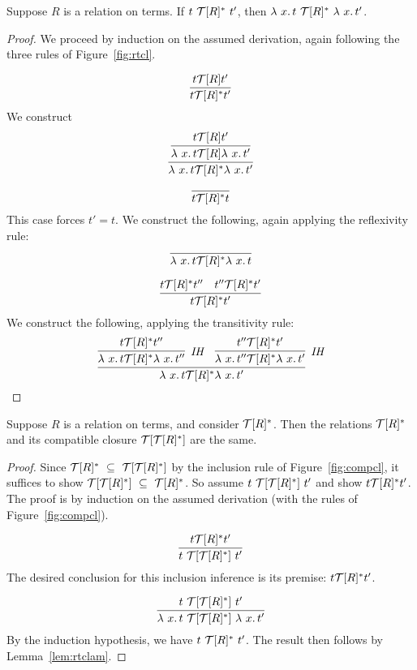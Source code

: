 \begin{lemma}
\label{lem:rtclam}
Suppose $R$ is a relation on terms.  
If $t\ \Tau[R]^*\ t'$, then $\lam{x}{t}\ \Tau[R]^*\ \lam{x}{t'}$.
\end{lemma}
\begin{proof}
We proceed by induction on the assumed derivation, again following the three rules of Figure~\ref{fig:rtcl}.

  \case{ }
  \[
  \infer{t \Tau[R]^* t'}{t \Tau[R] t'}
  \]
  \noindent We construct
  \[
  \infer{\lam{x}{t} \Tau[R]^* \lam{x}{t'}}
        {\infer{\lam{x}{t} \Tau[R] \lam{x}{t'}}
               {t \Tau[R] t'}}
  \]

  \case{ }
  \[
  \infer{t \Tau[R]^* t}{\ }
  \]
  \noindent This case forces $t' = t$.  We construct the following, again applying the reflexivity rule:
  \[
  \infer{\lam{x}{t} \Tau[R]^* \lam{x}{t}}{\ }
  \]

  \case{ }
  \[
  \infer{t \Tau[R]^* t'}{t \Tau[R]^* t'' & t'' \Tau[R]^* t'}
  \]
  \noindent We construct the following, applying the transitivity rule:
  \[
  \infer{\lam{x}{t} \Tau[R]^* \lam{x}{t'}}{\infer[\textit{IH}]{\lam{x}{t} \Tau[R]^* \lam{x}{t''}}{t \Tau[R]^* t''}
                                             & \infer[\textit{IH}]{\lam{x}{t''} \Tau[R]^* \lam{x}{t'}}{t'' \Tau[R]^* t'}}
  \]

\end{proof}

\begin{lemma}
\label{lem:comprtc}
  Suppose $R$ is a relation on terms, and consider $\mathcal{T}[R]^*$.
  Then the relations $\mathcal{T}[R]^*$  and its compatible closure $\mathcal{T}[\mathcal{T}[R]^*]$ are the same.
\end{lemma}
\begin{proof}
  Since $\Tau[R]^*\ \subseteq\ \Tau[\Tau[R]^*]$ by the inclusion rule
  of Figure~\ref{fig:compcl}, it suffices to show $\mathcal{T}[\mathcal{T}[R]^*]\ \subseteq\ \mathcal{T}[R]^*$.
  So assume $t\ \mathcal{T}[\mathcal{T}[R]^*]\ t'$ and show $t \mathcal{T}[R]^* t'$.  The proof
  is by induction on the assumed derivation (with the rules of Figure~\ref{fig:compcl}).

  \case{ } 
  \[
  \infer{t\ \Tau[\Tau[R]^*]\ t'}{t \Tau[R]^* t'}
  \]
  \noindent The desired conclusion for this inclusion inference is its premise: $t \mathcal{T}[R]^* t'$.

  \case{ }
  \[
  \infer{\lam{x}{t}\ \Tau[\Tau[R]^*]\ \lam{x}{t'}}{t\ \Tau[\Tau[R]^*]\ t'}
  \]
  \noindent By the induction hypothesis, we have $t\ \Tau[R]^*\ t'$.  The result
  then follows by Lemma~\ref{lem:rtclam}. 


  \end{proof}
        
